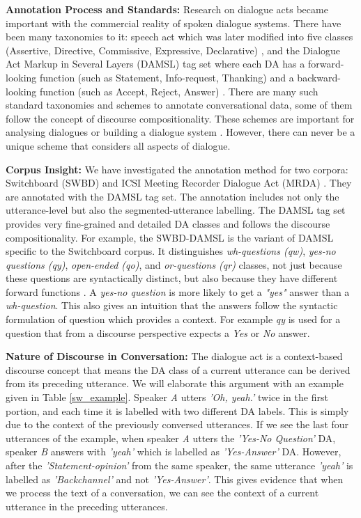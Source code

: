 \documentclass[10pt, a4paper]{article}
\begin{document}
\textbf{Annotation Process and Standards:} Research on dialogue acts became important with the commercial reality of spoken dialogue systems. 
There have been many taxonomies to it: speech act \cite{austin1962things} which was later modified into five classes (Assertive, Directive, Commissive, Expressive, Declarative) \cite{searle1979}, and the Dialogue Act Markup in Several Layers (DAMSL) tag set where each DA has a forward-looking function (such as Statement, Info-request, Thanking)
and a backward-looking function (such as Accept, Reject, Answer) \cite{allenCore1997}.
There are many such standard taxonomies and schemes to annotate conversational data, some of them follow the concept of discourse compositionality. 
These schemes are important for analysing dialogues or building a dialogue system \cite{skantze2007}.
However, there can never be a unique scheme that considers all aspects of dialogue.

\textbf{Corpus Insight:} We have investigated the annotation method for two corpora: Switchboard (SWBD) \cite{godfrey1992switchboard,shribergSwitch} and ICSI Meeting Recorder Dialogue Act (MRDA) \cite{shriberg2004icsi}. They are annotated with the DAMSL tag set. 
The annotation includes not only the utterance-level but also the segmented-utterance labelling.
The DAMSL tag set provides very fine-grained and detailed DA classes and follows the discourse compositionality.
For example, the SWBD-DAMSL is the variant of DAMSL specific to the Switchboard corpus.
It distinguishes \textit{wh-questions (qw)}, \textit{yes-no questions (qy)}, \textit{open-ended (qo)}, and \textit{or-questions (qr)} classes, not just because these questions are syntactically distinct, but also because they have different forward functions \cite{danjur1997swbddamsl}.
A \textit{yes-no question} is more likely to get a \textit{"yes"} answer than a \textit{wh-question}.
This also gives an intuition that the answers follow the syntactic formulation of question which provides a context.
For example \textit{qy} is used for a question that from a discourse perspective expects a \textit{Yes} or \textit{No} answer.

\textbf{Nature of Discourse in Conversation:} The dialogue act is a context-based discourse concept that means the DA class of a current utterance can be derived from its preceding utterance. 
We will elaborate this argument with an example given in Table \ref{sw_example}.
Speaker \textit{A} utters \textit{'Oh, yeah.'} twice in the first portion, and each time it is labelled with two different DA labels. 
This is simply due to the context of the previously conversed utterances.
If we see the last four utterances of the example, when speaker \textit{A} utters the \textit{'Yes-No Question'} DA, speaker \textit{B} answers with \textit{'yeah'} which is labelled as \textit{'Yes-Answer'} DA. 
However, after the \textit{'Statement-opinion'} from the same speaker, the same utterance \textit{'yeah'} is labelled as \textit{'Backchannel'} and not \textit{'Yes-Answer'}. 
This gives evidence that when we process the text of a conversation, we can see the context of a current utterance in the preceding utterances.
\end{document}
